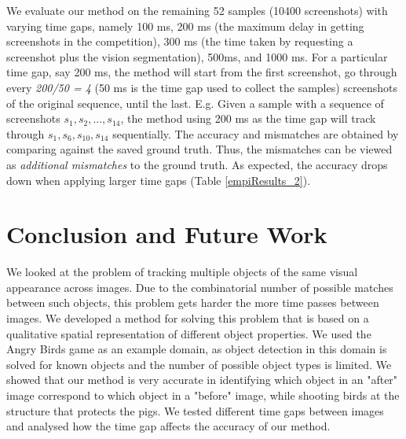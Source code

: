 \documentclass[letterpaper]{article}
\begin{document}
We evaluate our method on the remaining 52 samples (10400 screenshots) with varying time gaps, namely 100 ms, 200 ms (the maximum delay in getting screenshots in the competition), 300 ms (the time taken by requesting a screenshot plus the vision segmentation), 500ms, and 1000 ms. For a particular time gap, say 200 ms, the method will start from the first screenshot, go through every \emph{200/50 = 4} (50 ms is the time gap used to collect the samples) screenshots of the original sequence, until the last. E.g. Given a sample with a sequence of screenshots $s_1, s_2, ..., s_{14}$, the method using 200 ms as the time gap will track through $s_1, s_6, s_{10}, s_{14}$ sequentially. The accuracy and mismatches are obtained by comparing against the saved ground truth. Thus, the mismatches can be viewed as \emph{additional mismatches} to the ground truth. As expected, the accuracy drops down when applying larger time gaps (Table \ref{empiResults_2}). 
\vspace{-2mm}



\section{Conclusion and Future Work}

We looked at the problem of tracking multiple objects of the same visual appearance across images. Due to the combinatorial number of possible matches between such objects, this problem gets harder the more time passes between images. We developed a method for solving this problem that is based on a qualitative spatial representation of different object properties. We used the Angry Birds game as an example domain, as object detection in this domain is solved for known objects and the number of possible object types is limited. We showed that our method is very accurate in identifying which object in an "after" image correspond to which object in a "before" image, while shooting birds at the structure that protects the pigs. We tested different time gaps between images and analysed how the time gap affects the accuracy of our method. 
\end{document}
